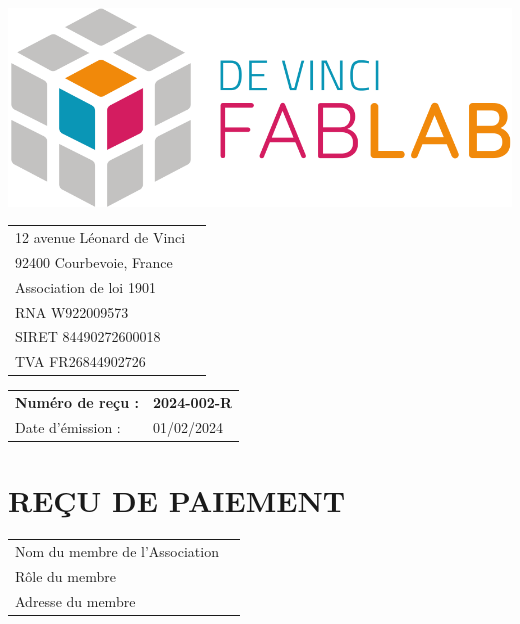 \documentclass[11pt,a4paper]{article}
\begin{document}
\thispagestyle{empty}


\begin{minipage}{0.4\textwidth}
    \includegraphics[width=0.7\linewidth]{../assets/logo_fablab.png}

    \vspace{0.5cm}

    \begin{tabular}{ll}
        12 avenue Léonard de Vinci \\
        92400 Courbevoie, France   \\
        Association de loi 1901    \\
        RNA W922009573             \\
        SIRET 84490272600018       \\
        TVA  FR26844902726         \\
    \end{tabular}
\end{minipage}\begin{minipage}{0.6\textwidth}
    \begin{flushright}
        \begin{tabular}{ll}
            \textbf{Numéro de reçu :} & \textbf{2024-002-R} \\
            Date d'émission :         & 01/02/2024          \\
        \end{tabular}
    \end{flushright}
\end{minipage}

\begin{minipage}[t]{0.5\textwidth}
    \hspace*{0pt}\vspace*{\fill}
    \section*{\LARGE REÇU DE PAIEMENT}
\end{minipage}\begin{minipage}[t]{0.5\textwidth}
    \begin{framed}
        \begin{tabular}{ll}
            Nom du membre de l'Association \\
            Rôle du membre                 \\
            Adresse du membre              \\
        \end{tabular}
    \end{framed}
    \vspace{0.1cm}
\end{minipage}
\end{document}
